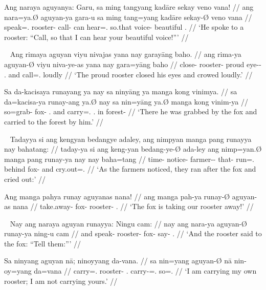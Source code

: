 \a\begingl
	\gla Ang naraya aguyanya: Garu, sa ming tangyang kadāre sekay veno vana! //
	\glb ang nara=ya.Ø aguyan-ya gara-u sa ming tang=yang kadāre sekay-Ø veno
		vana //
	\glc \AgtT{} speak=\TsgM{}.\Top{} rooster-\Loc{} call-\Imp{} \PatT{} can
		hear=\Fsg{}.\Aarg{} so.that voice-\Top{} beautiful \Second{}.\Gen{} //
	\glft `He spoke to a rooster: \enquote{Call, so that I can hear
		your beautiful voice!}' //
\endgl

\xe

\pex~ %
\a\begingl
	\gla Ang rimaya aguyan viyu nivajas yana nay garayāng baho. //
	\glb ang rima-ya aguyan-Ø viyu niva-ye-as yana nay gara=yāng baho //
	\glc \AgtT{} close-\TsgM{} rooster-\Top{} proud eye-\Pl{}-\Parg{}
		\TsgM{}.\Gen{} and call=\TsgM{}.\Aarg{} loudly //
	\glft `The proud rooster closed his eyes and crowed loudly.' //
\endgl

\a\begingl
	\gla Sa da-kacisaya runayang ya nay sa ninyāng ya manga kong vinimya. //
	\glb sa da=kacisa-ya runay-ang ya.Ø nay sa nin=yāng ya.Ø manga kong 
		vinim-ya //
	\glc \PatT{} so=grab-\TsgM{} fox-\Aarg{} \TsgM{}.\Top{} and \PatT{}
		carry=\TsgM{}.\Aarg{} \TsgM{}.\Top{} \Dyn{} in forest-\Loc{} //
	\glft `There he was grabbed by the fox and carried to the forest by him.' //
\endgl

\xe

\pex~ %
\a\begingl
	\gla Tadayya si ang kengyan bedangye adaley, ang nimpyan manga pang runayya
		nay bahatang: //
	\glb taday-ya si ang keng-yan bedang-ye-Ø ada-ley ang nimp=yan.Ø manga pang
		runay-ya nay nay baha=tang //
	\glc time-\Loc{} \Rel{} \AgtT{} notice-\TplM{} farmer-\Pl{}-\Top{}
		that-\PargI{} \AgtT{} run=\TplM{}.\Top{} \Dyn{} behind fox-\Loc{} and
		cry.out=\TplM{}.\Aarg{} //
	\glft `As the farmers noticed, they ran after the fox and cried out:' //
\endgl

\a\begingl
	\gla Ang manga pahya runay aguyanas nana! //
	\glb ang manga pah-ya runay-Ø aguyan-as nana //
	\glc \AgtT{} \Prog{} take.away-\TsgM{} fox-\Top{} rooster-\Parg{}
		\Fsg{}.\Gen{} //
	\glft `The fox is taking our rooster away!' //
\endgl

\xe

\pex~ %
\a\begingl
	\gla Nay ang naraya aguyan runayya: Ningu cam: //
	\glb nay ang nara-ya aguyan-Ø runay-ya ning-u cam //
	\glc and \AgtT{} speak-\TsgM{} rooster-\Top{} fox-\Loc{} say-\Imp{}
		\TplM{}.\Dat{} //
	\glft `And the rooster said to the fox: \enquote{Tell them:}' //
\endgl

\a\label{ex:negativbindung}\begingl
	\gla Sa ninyang aguyan nā; ninoyyang da-vana. //
	\glb sa nin=yang aguyan-Ø nā nin-oy=yang da=vana //
	\glc \PatT{} carry=\Fsg{}.\Aarg{} rooster-\Top{} \Fsg{}.\Gen{}
		carry-\Neg{}=\Fsg{}.\Aarg{} so=\Spl{}.\Gen{} //
	\glft `I am carrying my own rooster; I am not carrying yours.' //
\endgl

